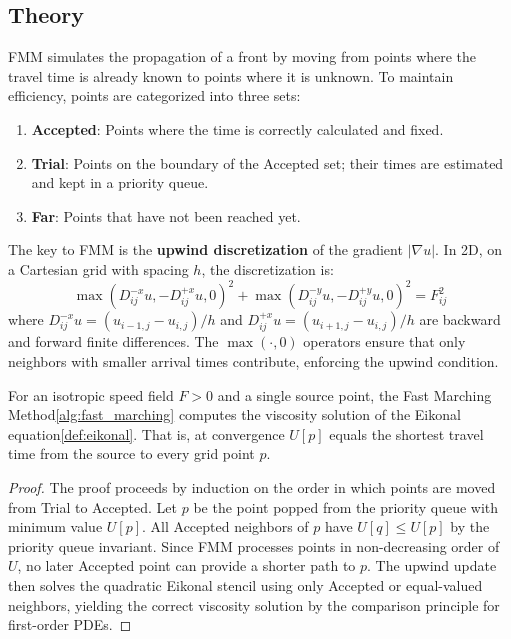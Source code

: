 \subsection{Theory}
FMM simulates the propagation of a front by moving from points where the travel time is already known to points where it is unknown. To maintain efficiency, points are categorized into three sets:
\begin{enumerate}
  \item \textbf{Accepted}: Points where the time is correctly calculated and fixed.
  \item \textbf{Trial}: Points on the boundary of the Accepted set; their times are estimated and kept in a priority queue.
  \item \textbf{Far}: Points that have not been reached yet.
\end{enumerate}

The key to FMM is the \textbf{upwind discretization} of the gradient $|\nabla u|$. In 2D, on a Cartesian grid with spacing $h$, the discretization is:
$$\max(D^{-x}_{ij}u, -D^{+x}_{ij}u, 0)^2 + \max(D^{-y}_{ij}u, -D^{+y}_{ij}u, 0)^2 = F_{ij}^2$$
where $D^{-x}_{ij}u = (u_{i-1,j} - u_{i,j})/h$ and $D^{+x}_{ij}u = (u_{i+1,j} - u_{i,j})/h$ are backward and forward finite differences. The $\max(\cdot, 0)$ operators ensure that only neighbors with smaller arrival times contribute, enforcing the upwind condition.

\begin{theorem}\label{thm:fmm_correctness}
For an isotropic speed field $F > 0$ and a single source point, the Fast Marching Method\cref{alg:fast_marching} computes the viscosity solution of the Eikonal equation\cref{def:eikonal}. That is, at convergence $U[p]$ equals the shortest travel time from the source to every grid point $p$.
\end{theorem}
\begin{proof}
The proof proceeds by induction on the order in which points are moved from Trial to Accepted. Let $p$ be the point popped from the priority queue with minimum value $U[p]$. All Accepted neighbors of $p$ have $U[q] \le U[p]$ by the priority queue invariant. Since FMM processes points in non-decreasing order of $U$, no later Accepted point can provide a shorter path to $p$. The upwind update then solves the quadratic Eikonal stencil using only Accepted or equal-valued neighbors, yielding the correct viscosity solution by the comparison principle for first-order PDEs.
\end{proof}

